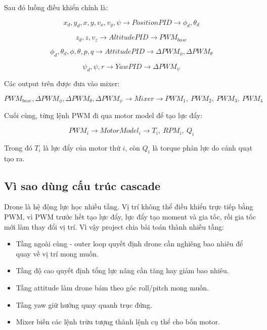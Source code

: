 Sau đó luồng điều khiển chính là:

\begin{equation}
    x_d,y_d,x,y,v_x,v_y,\psi
    \longrightarrow
    PositionPID
    \longrightarrow
    \phi_d,\theta_d
\end{equation}

\begin{equation}
    z_d,z,v_z
    \longrightarrow
    AltitudePID
    \longrightarrow
    PWM_{base}
\end{equation}

\begin{equation}
    \phi_d,\theta_d,\phi,\theta,p,q
    \longrightarrow
    AttitudePID
    \longrightarrow
    \Delta PWM_\phi,\Delta PWM_\theta
\end{equation}

\begin{equation}
    \psi_d,\psi,r
    \longrightarrow
    YawPID
    \longrightarrow
    \Delta PWM_\psi
\end{equation}

Các output trên được đưa vào mixer:

\begin{equation}
    PWM_{base},
    \Delta PWM_\phi,
    \Delta PWM_\theta,
    \Delta PWM_\psi
    \longrightarrow
    Mixer
    \longrightarrow
    PWM_1,\ PWM_2,\ PWM_3,\ PWM_4
\end{equation}

Cuối cùng, từng lệnh PWM đi qua motor model để tạo lực đẩy:

\begin{equation}
    PWM_i
    \longrightarrow
    MotorModel_i
    \longrightarrow
    T_i,\ RPM_i,\ Q_i
\end{equation}

Trong đó $T_i$ là lực đẩy của motor thứ $i$, còn $Q_i$ là torque phản lực do
cánh quạt tạo ra.

\subsection{Vì sao dùng cấu trúc cascade}

Drone là hệ động lực học nhiều tầng. Vị trí không thể điều khiển trực tiếp bằng
PWM, vì PWM trước hết tạo lực đẩy, lực đẩy tạo moment và gia tốc, rồi gia tốc
mới làm thay đổi vị trí. Vì vậy project chia bài toán thành nhiều tầng:

\begin{itemize}
    \item Tầng ngoài cùng - outer loop quyết định drone cần nghiêng bao nhiêu để quay về vị
    trí mong muốn.
    \item Tầng độ cao quyết định tổng lực nâng cần tăng hay giảm bao nhiêu.
    \item Tầng attitude làm drone bám theo góc roll/pitch mong muốn.
    \item Tầng yaw giữ hướng quay quanh trục đứng.
    \item Mixer biến các lệnh trừu tượng thành lệnh cụ thể cho bốn motor.
\end{itemize}


